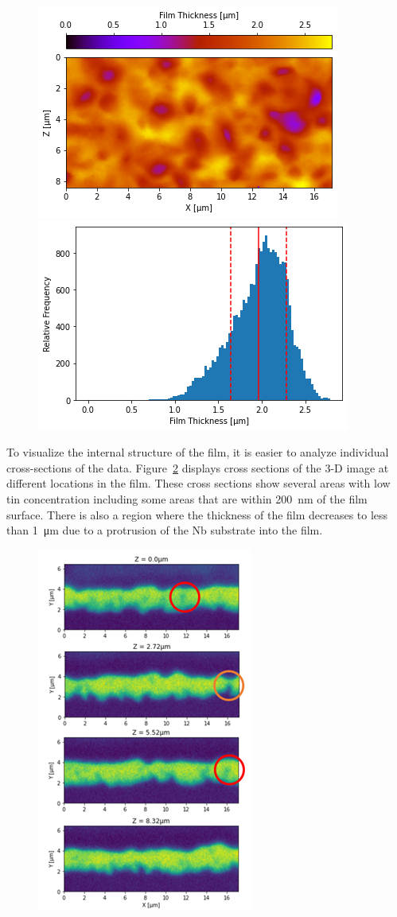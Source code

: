 \begin{figure}[htb]%
    \centering%
    \includegraphics[width=0.5\columnwidth]{../figs/Figure-4a.png}%
    \includegraphics[width=0.5\columnwidth]{../figs/Figure-4b.png}%
    \caption{}%
    \label{fig:4}%
\end{figure}
 
To visualize the internal structure of the film, it is easier to analyze individual cross-sections of the data. Figure~\ref{fig:5} displays cross sections of the 3-D image at different locations in the film. These cross sections show several areas with low tin concentration including some areas that are within \qty{200}{\nano\meter} of the film surface. There is also a region where the thickness of the film decreases to less than \qty{1}{\micro\meter} due to a protrusion of the Nb substrate into the film.

\begin{figure}[htb]%
    \centering%
    \includegraphics[width=0.5\columnwidth]{../figs/Figure-5.png}%
    \caption{}%
    \label{fig:5}%
\end{figure}

